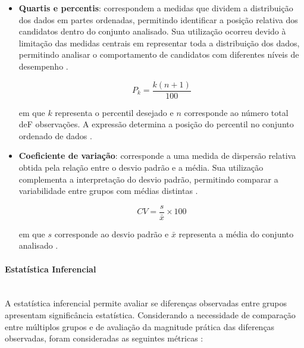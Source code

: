 \documentclass[a4paper,10pt, twocolumn]{article}
\begin{document}
\begin{itemize}
em que $s$ representa o desvio padrão, $x_i$ corresponde a cada observação, $\bar{x}$ representa a média do conjunto de dados e $n$ corresponde ao número total de observações \cite{labone_estatistica}.

\item \textbf{Quartis e percentis}: correspondem a medidas que dividem a distribuição dos dados em partes ordenadas, permitindo identificar a posição relativa dos candidatos dentro do conjunto analisado. Sua utilização ocorreu devido à limitação das medidas centrais em representar toda a distribuição dos dados, permitindo analisar o comportamento de candidatos com diferentes níveis de desempenho \cite{labone_estatistica}.

\begin{equation}
P_k=
\frac{k(n+1)}{100}
\end{equation}

em que $k$ representa o percentil desejado e $n$ corresponde ao número total deF observações. A expressão determina a posição do percentil no conjunto ordenado de dados \cite{labone_estatistica}.

\item \textbf{Coeficiente de variação}: corresponde a uma medida de dispersão relativa obtida pela relação entre o desvio padrão e a média. Sua utilização complementa a interpretação do desvio padrão, permitindo comparar a variabilidade entre grupos com médias distintas \cite{labone_estatistica}.

\begin{equation}
CV=
\frac{s}{\bar{x}}
\times100
\end{equation}

em que $s$ corresponde ao desvio padrão e $\bar{x}$ representa a média do conjunto analisado \cite{labone_estatistica}.

\end{itemize}

\paragraph{Estatística Inferencial}
\mbox{}\\

A estatística inferencial permite avaliar se diferenças observadas entre grupos apresentam significância estatística. Considerando a necessidade de comparação entre múltiplos grupos e de avaliação da magnitude prática das diferenças observadas, foram consideradas as seguintes métricas \cite{field2018discovering,cohen1988statistical}:
\end{document}
